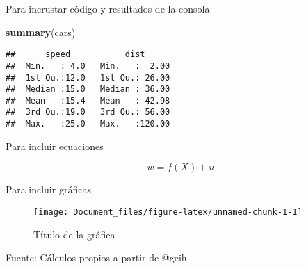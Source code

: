 \documentclass[
  11pt,
  letterpaper,
]{article}
\newenvironment{Shaded}{\begin{snugshade}}{\end{snugshade}}
\newcommand{\FunctionTok}[1]{\textcolor[rgb]{0.13,0.29,0.53}{\textbf{#1}}}
\newcommand{\NormalTok}[1]{#1}
\begin{document}
Para incrustar código y resultados de la consola

\begin{Shaded}
\begin{Highlighting}[]
\FunctionTok{summary}\NormalTok{(cars)}
\end{Highlighting}
\end{Shaded}

\begin{verbatim}
##      speed           dist       
##  Min.   : 4.0   Min.   :  2.00  
##  1st Qu.:12.0   1st Qu.: 26.00  
##  Median :15.0   Median : 36.00  
##  Mean   :15.4   Mean   : 42.98  
##  3rd Qu.:19.0   3rd Qu.: 56.00  
##  Max.   :25.0   Max.   :120.00
\end{verbatim}

Para incluir ecuaciones

\[
w=f(X)+u
\]

Para incluir gráficas

\begin{figure}

{\centering \texttt{[image: Document\_files/figure-latex/unnamed-chunk-1-1]} 

}

\caption{Título de la gráfica}\label{fig:unnamed-chunk-1}
\end{figure}
\begin{center}\footnotesize{Fuente: Cálculos propios a partir de @geih}\end{center}
\end{document}
